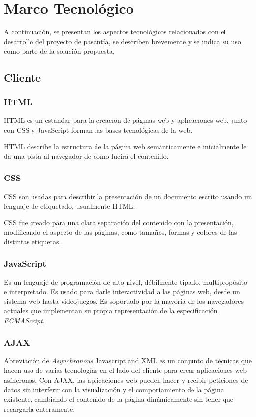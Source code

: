 \chapter{Marco Tecnológico}
\thispagestyle{empty} %

A continuación, se presentan los aspectos tecnológicos relacionados con el desarrollo del proyecto de pasantía, se describen brevemente y se indica su uso como parte de la solución propuesta.

\section{Cliente}

\subsection{HTML}

\gls{HTML} es un estándar para la creación de páginas web y aplicaciones web. junto con \gls{CSS} y JavaScript forman las bases tecnológicas de la web\cite{bib:html}. 

HTML describe la estructura de la página web semánticamente e inicialmente le da una pista al navegador de como lucirá el contenido.


\subsection{CSS}
\gls{CSS} son usadas para describir la presentación de un documento escrito usando un lenguaje de etiquetado, usualmente \gls{HTML}. 

\gls{CSS} fue creado para una clara separación del contenido con la presentación, modificando el aspecto de las páginas, como tamaños, formas y colores de las distintas etiquetas\cite{bib:css}. 

\subsection{JavaScript}
Es un lenguaje de programación de alto nivel, débilmente tipado, multipropósito e interpretado. Es usado para darle interactividad a las páginas web, desde un sistema web hasta videojuegos. Es soportado por la mayoría de los navegadores actuales que implementan su propia representación de la especificación \emph{ECMAScript}\cite{bib:js}. 

\subsection{AJAX}
Abreviación de \emph{Asynchronous} Javascript and \gls{XML} es un conjunto de técnicas que hacen uso de varias tecnologías en el lado del cliente para crear aplicaciones web asíncronas. Con \gls{AJAX}, las aplicaciones web pueden hacer y recibir peticiones de datos sin interferir con la visualización y el comportamiento de la página existente, cambiando el contenido de la página dinámicamente sin tener que recargarla enteramente\cite{bib:ajax}. 


